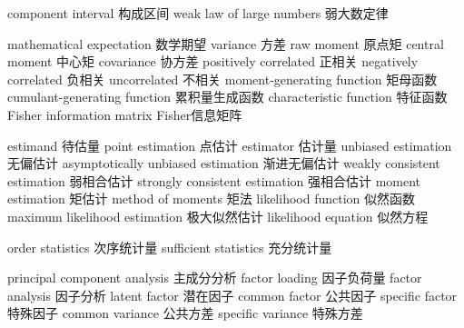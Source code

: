 {component interval} 
{构成区间}
{weak law of large numbers} 
{弱大数定律}


{mathematical expectation} 
{数学期望}
{variance} 
{方差}
{raw moment} 
{原点矩}
{central moment} 
{中心矩}
{covariance} 
{协方差}
{positively correlated} 
{正相关}
{negatively correlated} 
{负相关}
{uncorrelated} 
{不相关}
{moment-generating function} 
{矩母函数}
{cumulant-generating function} 
{累积量生成函数}
{characteristic function} 
{特征函数}
{Fisher information matrix} 
{Fisher信息矩阵}


{estimand} 
{待估量}
{point estimation} 
{点估计}
{estimator} 
{估计量}
{unbiased estimation} 
{无偏估计}
{asymptotically unbiased estimation} 
{渐进无偏估计}
{weakly consistent estimation} 
{弱相合估计}
{strongly consistent estimation} 
{强相合估计}
{moment estimation} 
{矩估计}
{method of moments} 
{矩法}
{likelihood function} 
{似然函数}
{maximum likelihood estimation} 
{极大似然估计}
{likelihood equation} 
{似然方程}

{order statistics} 
{次序统计量}
{sufficient statistics} 
{充分统计量}

{principal component analysis} 
{主成分分析}
{factor loading} 
{因子负荷量}
{factor analysis} 
{因子分析}
{latent factor} 
{潜在因子}
{common factor} 
{公共因子}
{specific factor} 
{特殊因子}
{common variance} 
{公共方差}
{specific variance} 
{特殊方差}

